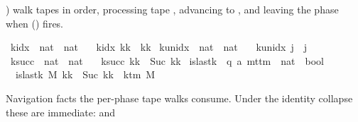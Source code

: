 \begin{isabellebody}
\begin{isamarkuptext}
  ) walk tapes in order, processing tape
  , advancing to , and leaving the phase when
   () fires.%
\end{isamarkuptext}\isamarkuptrue%
\isamarkupfalse%
\ k{\isacharunderscore}{\kern0pt}idx\ {\isacharcolon}{\kern0pt}{\isacharcolon}{\kern0pt}\ {\isachardoublequoteopen}nat\ {\isasymRightarrow}\ nat{\isachardoublequoteclose}\ \isanewline
\ \ {\isachardoublequoteopen}k{\isacharunderscore}{\kern0pt}idx\ kk\ {\isacharequal}{\kern0pt}\ kk{\isachardoublequoteclose}\isanewline
\isanewline
{}\isamarkupfalse%
\ k{\isacharunderscore}{\kern0pt}unidx\ {\isacharcolon}{\kern0pt}{\isacharcolon}{\kern0pt}\ {\isachardoublequoteopen}nat\ {\isasymRightarrow}\ nat{\isachardoublequoteclose}\ \isanewline
\ \ {\isachardoublequoteopen}k{\isacharunderscore}{\kern0pt}unidx\ j\ {\isacharequal}{\kern0pt}\ j{\isachardoublequoteclose}\isanewline
\isanewline
{}\isamarkupfalse%
\ k{\isacharunderscore}{\kern0pt}succ\ {\isacharcolon}{\kern0pt}{\isacharcolon}{\kern0pt}\ {\isachardoublequoteopen}nat\ {\isasymRightarrow}\ nat{\isachardoublequoteclose}\ \isanewline
\ \ {\isachardoublequoteopen}k{\isacharunderscore}{\kern0pt}succ\ kk\ {\isacharequal}{\kern0pt}\ Suc\ kk{\isachardoublequoteclose}\isanewline
\isanewline
{}\isamarkupfalse%
\ is{\isacharunderscore}{\kern0pt}last{\isacharunderscore}{\kern0pt}k\ {\isacharcolon}{\kern0pt}{\isacharcolon}{\kern0pt}\ {\isachardoublequoteopen}{\isacharparenleft}{\kern0pt}{\isacharprime}{\kern0pt}q{\isacharcomma}{\kern0pt}\ {\isacharprime}{\kern0pt}a{\isacharparenright}{\kern0pt}\ mttm\ {\isasymRightarrow}\ nat\ {\isasymRightarrow}\ bool{\isachardoublequoteclose}\ \isanewline
\ \ {\isachardoublequoteopen}is{\isacharunderscore}{\kern0pt}last{\isacharunderscore}{\kern0pt}k\ M\ kk\ {\isasymlongleftrightarrow}\ Suc\ kk\ {\isacharequal}{\kern0pt}\ k{\isacharunderscore}{\kern0pt}tm\ M{\isachardoublequoteclose}%
\begin{isamarkuptext}%
Navigation facts the per-phase tape walks consume.  Under the
  identity collapse these are immediate:  and 

\end{isamarkuptext}
\end{isabellebody}
